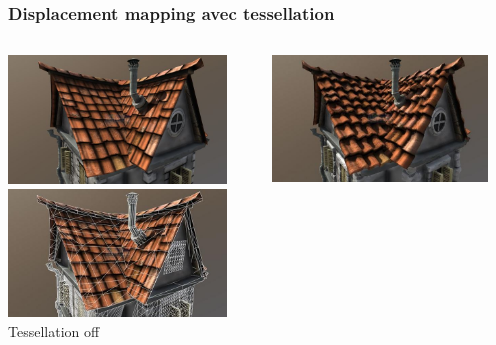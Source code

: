 \documentclass{beamer}
\begin{document}
\begin{frame}
    \frametitle{Displacement mapping avec tessellation}
    \begin{columns}[t]
        \begin{column}{0.5\textwidth}
            \centering
            \includegraphics[width=0.9\textwidth]{images/tesselation_off}\\
            \includegraphics[width=0.9\textwidth]{images/tesselation_off_mesh}\\
            Tessellation off
        \end{column}
        \begin{column}{0.5\textwidth}
            \centering
            \includegraphics[width=0.9\textwidth]{images/tesselation_on}\\

\end{column}
\end{columns}
\end{frame}
\end{document}
